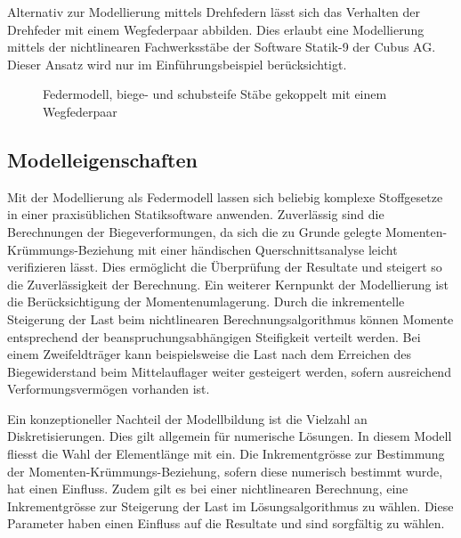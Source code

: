 \documentclass[
  11pt,
  letterpaper,
]{scrreprt}
\begin{document}
Alternativ zur Modellierung mittels Drehfedern lässt sich das Verhalten
der Drehfeder mit einem Wegfederpaar abbilden. Dies erlaubt eine
Modellierung mittels der nichtlinearen Fachwerksstäbe der Software
Statik-9 der Cubus AG. Dieser Ansatz wird nur im Einführungsbeispiel
berücksichtigt.

\begin{figure}[H]


\caption{\label{fig-modell_wegfeder}Federmodell, biege- und schubsteife
Stäbe gekoppelt mit einem Wegfederpaar}

\end{figure}%

\subsection{Modelleigenschaften}\label{modelleigenschaften}

Mit der Modellierung als Federmodell lassen sich beliebig komplexe
Stoffgesetze in einer praxisüblichen Statiksoftware anwenden.
Zuverlässig sind die Berechnungen der Biegeverformungen, da sich die zu
Grunde gelegte Momenten-Krümmungs-Beziehung mit einer händischen
Querschnittsanalyse leicht verifizieren lässt. Dies ermöglicht die
Überprüfung der Resultate und steigert so die Zuverlässigkeit der
Berechnung. Ein weiterer Kernpunkt der Modellierung ist die
Berücksichtigung der Momentenumlagerung. Durch die inkrementelle
Steigerung der Last beim nichtlinearen Berechnungsalgorithmus können
Momente entsprechend der beanspruchungsabhängigen Steifigkeit verteilt
werden. Bei einem Zweifeldträger kann beispielsweise die Last nach dem
Erreichen des Biegewiderstand beim Mittelauflager weiter gesteigert
werden, sofern ausreichend Verformungsvermögen vorhanden ist.

Ein konzeptioneller Nachteil der Modellbildung ist die Vielzahl an
Diskretisierungen. Dies gilt allgemein für numerische Lösungen. In
diesem Modell fliesst die Wahl der Elementlänge mit ein. Die
Inkrementgrösse zur Bestimmung der Momenten-Krümmungs-Beziehung, sofern
diese numerisch bestimmt wurde, hat einen Einfluss. Zudem gilt es bei
einer nichtlinearen Berechnung, eine Inkrementgrösse zur Steigerung der
Last im Lösungsalgorithmus zu wählen. Diese Parameter haben einen
Einfluss auf die Resultate und sind sorgfältig zu wählen.
\end{document}

